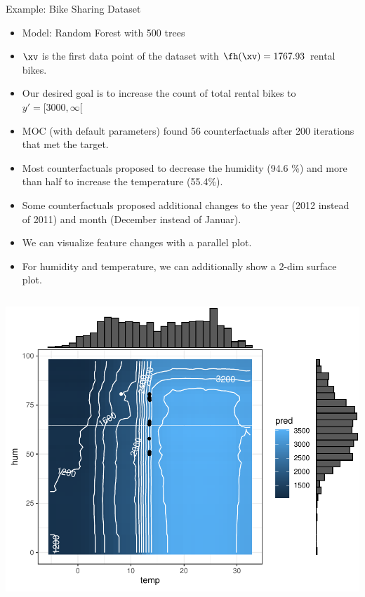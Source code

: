 \documentclass[11pt,compress,t,notes=noshow, xcolor=table]{beamer}
\begin{document}
\begin{vbframe}{Example: Bike Sharing Dataset}
	\begin{itemize}
		\item Model: Random Forest with 500 trees
		\item $\xv$ is the first data point of the dataset with $\fh(\xv) = 1767.93$ rental bikes. 
		\item Our desired goal is to increase the count of total rental bikes to $y' = [3000, \infty[$
		\item MOC (with default parameters) found 56 counterfactuals after 200 iterations that met the target.
		\item Most counterfactuals proposed to decrease the humidity (94.6 \%) and more than half to increase the temperature (55.4\%). 
		\item Some counterfactuals proposed additional changes to the year (2012 instead of 2011) and month (December instead of Januar).
		\framebreak 
		\item We can visualize feature changes with a parallel plot. 
		\item For humidity and temperature, we can additionally show a 2-dim surface plot. 
	\end{itemize}
	\vspace{-0.5cm}
	\begin{columns}
		\begin{column}{0.5\textwidth}
			\begin{center}
				\includegraphics[width=1\textwidth]{figure/counterfactuals_bike_sp}
			\end{center}
		

\end{column}
\end{columns}
\end{vbframe}
\end{document}
